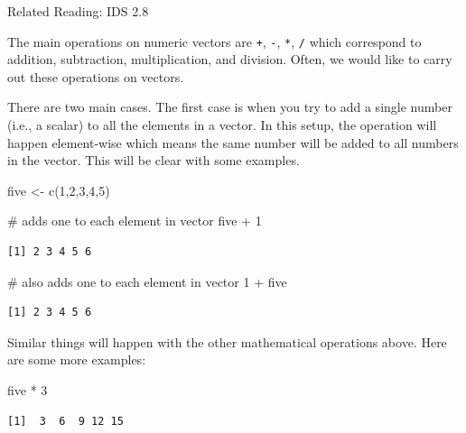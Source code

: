 \documentclass[
  letterpaper,
  DIV=11,
  numbers=noendperiod]{scrreprt}
\newenvironment{Shaded}{\begin{snugshade}}{\end{snugshade}}
\newcommand{\CommentTok}[1]{\textcolor[rgb]{0.37,0.37,0.37}{#1}}
\newcommand{\DecValTok}[1]{\textcolor[rgb]{0.68,0.00,0.00}{#1}}
\newcommand{\FunctionTok}[1]{\textcolor[rgb]{0.28,0.35,0.67}{#1}}
\newcommand{\NormalTok}[1]{\textcolor[rgb]{0.00,0.23,0.31}{#1}}
\newcommand{\OtherTok}[1]{\textcolor[rgb]{0.00,0.23,0.31}{#1}}
\newcommand{\SpecialCharTok}[1]{\textcolor[rgb]{0.37,0.37,0.37}{#1}}
\begin{document}
Related Reading: IDS 2.8

The main operations on numeric vectors are \texttt{+}, \texttt{-},
\texttt{*}, \texttt{/} which correspond to addition, subtraction,
multiplication, and division. Often, we would like to carry out these
operations on vectors.

There are two main cases. The first case is when you try to add a single
number (i.e., a scalar) to all the elements in a vector. In this setup,
the operation will happen element-wise which means the same number will
be added to all numbers in the vector. This will be clear with some
examples.

\begin{Shaded}
\begin{Highlighting}[]
\NormalTok{five }\OtherTok{\textless{}{-}} \FunctionTok{c}\NormalTok{(}\DecValTok{1}\NormalTok{,}\DecValTok{2}\NormalTok{,}\DecValTok{3}\NormalTok{,}\DecValTok{4}\NormalTok{,}\DecValTok{5}\NormalTok{)}

\CommentTok{\# adds one to each element in vector}
\NormalTok{five }\SpecialCharTok{+} \DecValTok{1}
\end{Highlighting}
\end{Shaded}

\begin{verbatim}
[1] 2 3 4 5 6
\end{verbatim}

\begin{Shaded}
\begin{Highlighting}[]
\CommentTok{\# also adds one to each element in vector}
\DecValTok{1} \SpecialCharTok{+}\NormalTok{ five}
\end{Highlighting}
\end{Shaded}

\begin{verbatim}
[1] 2 3 4 5 6
\end{verbatim}

Similar things will happen with the other mathematical operations above.
Here are some more examples:

\begin{Shaded}
\begin{Highlighting}[]
\NormalTok{five }\SpecialCharTok{*} \DecValTok{3}
\end{Highlighting}
\end{Shaded}

\begin{verbatim}
[1]  3  6  9 12 15
\end{verbatim}
\end{document}
